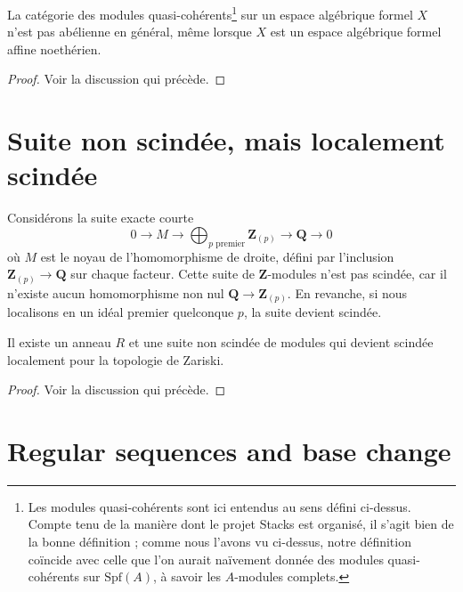 \begin{lemma}
\label{lemma-quasi-coherent-not-abelian}
La catégorie des modules quasi-cohérents\footnote{Les modules quasi-cohérents
sont ici entendus au sens défini ci-dessus. Compte tenu de la manière dont le projet Stacks
est organisé, il s'agit bien de la bonne définition ; comme nous l'avons vu ci-dessus,
notre définition coïncide avec celle que l'on aurait naïvement donnée des modules quasi-cohérents
sur $\text{Spf}(A)$, à savoir les $A$-modules complets.}
sur un espace algébrique formel
$X$ n'est pas abélienne en général, même lorsque $X$ est un espace algébrique
formel affine noethérien.
\end{lemma}

\begin{proof}
Voir la discussion qui précède.
\end{proof}





\section{Suite non scindée, mais localement scindée}
\label{section-nonsplit-locally-split}

\noindent
Considérons la suite exacte courte
$$
0 \to M \to
\bigoplus\nolimits_{p\text{ premier}} \mathbf{Z}_{(p)} \to \mathbf{Q} \to 0
$$
où $M$ est le noyau de l'homomorphisme de droite, défini par l'inclusion
$\mathbf{Z}_{(p)} \to \mathbf{Q}$ sur chaque facteur. Cette suite de
$\mathbf{Z}$-modules n'est pas scindée, car il n'existe aucun
homomorphisme non nul $\mathbf{Q} \to \mathbf{Z}_{(p)}$. En revanche, si
nous localisons en un idéal premier quelconque $p$, la suite devient scindée.

\begin{lemma}
\label{lemma-nonsplit-locally-split}
Il existe un anneau $R$ et une suite non scindée de modules
qui devient scindée localement pour la topologie de Zariski.
\end{lemma}

\begin{proof}
Voir la discussion qui précède.
\end{proof}





\section{Regular sequences and base change}
\label{section-regular-base-change}

